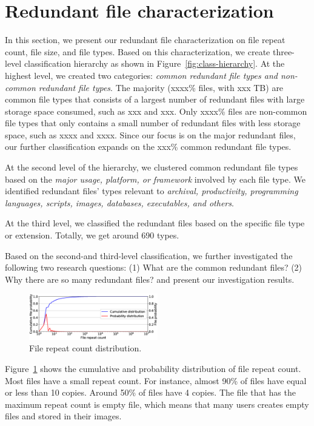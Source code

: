 \section{Redundant file characterization}
\label{sec:redundant_files}

In this section, we present our redundant file characterization on file repeat count, file size, and file types. 
Based on this characterization, we create three-level classification hierarchy as shown in Figure~\ref{fig:class-hierarchy}.
At the highest level, we created two categories: \textit{common redundant file types and non-common redundant file types}. 
The majority (xxxx\% files, with xxx TB) are common file types that consists of a largest number of redundant files with large storage space consumed, such as xxx and xxx. 
Only xxxx\% files are non-common file types that only contains a small number of redundant files with less storage space, such as xxxx and xxxx. 
Since our focus is on the major redundant files, our further classification expands on the xxx\% common redundant file types.  

At the second level of the hierarchy, we clustered common redundant file types based on the \textit{major usage, platform, or framework} involved by each file type. We identified redundant files' types relevant to \textit{archival, productivity, programming languages, scripts, images, databases, executables, and others}.

At the third level, we classified the redundant files based on the specific file type or extension. Totally, we get around 690 types. 

Based on the second-and third-level classification, we further investigated the following two research questions: (1) What are the common redundant files?
(2) Why there are so many redundant files? and present our investigation results.

\begin{figure}
	\centering
	\includegraphics[width=0.5\textwidth]{graphs/File_repeat_count.eps}
	\caption{File repeat count distribution.
	}
	\label{fig:file-repeat-cnt}
\end{figure}

Figure~\ref{fig:file-repeat-cnt} shows the cumulative and probability distribution of file repeat count. 
Most files have a small repeat count. For instance, almost 90\% of files have equal or less than 10 copies. Around 50\% of files have 4 copies.
The file that has the maximum repeat count is empty file, which means that many users creates empty files and stored in their images.

